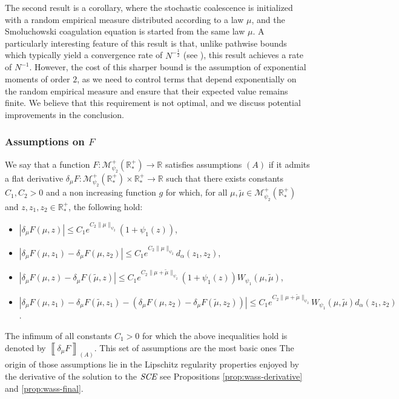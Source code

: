 \documentclass[11pt,a4paper]{article}
\newcommand{\RR}{\mathbb{R}}
\newcommand{\RRP}{\mathbb{R}^+_*}
\newcommand{\MC}{\mathcal{M}}
\newcommand{\SCE}{\emph{SCE}}
\newcommand{\A}{(A)}
\begin{document}
The second result is a corollary, where the stochastic coalescence is initialized with a random empirical measure distributed according to a law $\mu$, and the Smoluchowski coagulation equation is started from the same law $\mu$. A particularly interesting feature of this result is that, unlike pathwise bounds which typically yield a convergence rate of $N^{-\frac{1}{2}}$ (see \cite{cepedaSmoluchowskisEquationRate2011a}), this result achieves a rate of $N^{-1}$. However, the cost of this sharper bound is the assumption of exponential moments of order $2$, as we need to control terms that depend exponentially on the random empirical measure and ensure that their expected value remains finite. We believe that this requirement is not optimal, and we discuss potential improvements in the conclusion.
\subsubsection*{Assumptions on $F$}

We say that a function \(F : \MC^+_{\psi_2}(\RRP) \to \RR\) satisfies assumptions \(\A\) if it admits a flat derivative \(\delta_\mu F : \MC^+_{\psi_2}(\RRP) \times \RRP \to \RR\) such that there exists constants \(C_1,C_2 > 0\) and a non increasing function $g$ for which, for all \(\mu, \tilde{\mu} \in \MC^+_{\psi_2}(\RRP)\) and \(z, z_1, z_2 \in \RRP\), the following hold:
\begin{itemize}
    \item \(|\delta_\mu F(\mu, z)| \leq C_1 e^{C_2\|\mu\|_{\psi_2}} (1 + \psi_1(z))\),
    \item \(|\delta_\mu F(\mu, z_1) - \delta_\mu F(\mu, z_2)| \leq C_1 e^{C_2\|\mu\|_{\psi_2}} d_\alpha(z_1, z_2)\),
    \item \(|\delta_\mu F(\mu, z) - \delta_\mu F(\tilde{\mu}, z)| \leq C_1 e^{C_2\|\mu + \tilde{\mu}\|_{\psi_2}}(1 + \psi_1(z)) W_{\psi_1}(\mu, \tilde{\mu})\),
    \item \(|\delta_\mu F(\mu, z_1) - \delta_\mu F(\tilde{\mu}, z_1) - (\delta_\mu F(\mu, z_2) - \delta_\mu F(\tilde{\mu}, z_2))| \leq C_1 e^{C_2\|\mu + \tilde{\mu}\|_{\psi_2}} W_{\psi_1}(\mu, \tilde{\mu}) d_\alpha(z_1, z_2)\).
\end{itemize}

The infimum of all constants \(C_1 > 0\) for which the above inequalities hold is denoted by \(\left\llbracket \delta_\mu F \right\rrbracket_{\A}\). This set of assumptions are the most basic ones The origin of those assumptions lie in the Lipschitz regularity properties enjoyed by the derivative of the solution to the $\SCE$ see Propositions \ref{prop:wass-derivative} and \ref{prop:wass-final}.
\end{document}
